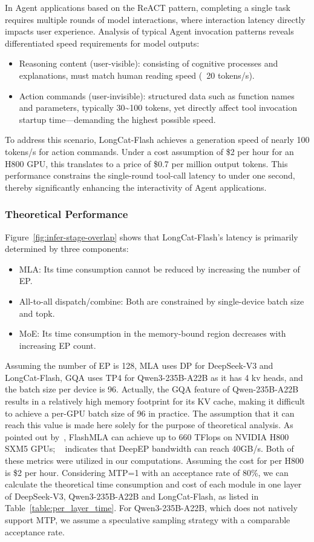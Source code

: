 \documentclass{article}
\newcommand{\longcat}{LongCat-Flash\xspace}
\begin{document}
In Agent applications based on the ReACT \citep{yao2023reactsynergizingreasoningacting} pattern, completing a single task requires multiple rounds of model interactions, where interaction latency directly impacts user experience. Analysis of typical Agent invocation patterns reveals differentiated speed requirements for model outputs:
\begin{itemize}
    \item Reasoning content (user-visible): consisting of cognitive processes and explanations, must match human reading speed (~20 tokens/s).
    \item Action commands (user-invisible): structured data such as function names and parameters, typically 30\textasciitilde 100 tokens, yet directly affect tool invocation startup time—demanding the highest possible speed.
\end{itemize}

To address this scenario, \longcat achieves a generation speed of nearly 100 tokens/s for action commands. Under a cost assumption of \$2 per hour for an H800 GPU, this translates to a price of \$0.7 per million output tokens. This performance constrains the single-round tool-call latency to under one second, thereby significantly enhancing the interactivity of Agent applications.

\subsubsection{Theoretical Performance}

Figure~\ref{fig:infer-stage-overlap} shows that \longcat's latency is primarily determined by three components:
\begin{itemize}
\item MLA: Its time consumption cannot be reduced by increasing the number of EP.
\item All-to-all dispatch/combine: Both are constrained by single-device batch size and topk.
\item MoE: Its time consumption in the memory-bound region decreases with increasing EP count.
\end{itemize}

Assuming the number of EP is 128, MLA uses DP for DeepSeek-V3 and \longcat, GQA uses TP4 for Qwen3-235B-A22B as it has 4 kv heads, and the batch size per device is 96. Actually, the GQA feature of Qwen-235B-A22B results in a relatively high memory footprint for its KV cache, making it difficult to achieve a per-GPU batch size of 96 in practice. The assumption that it can reach this value is made here solely for the purpose of theoretical analysis. As pointed out by~\citep{flashmla2025}, FlashMLA can achieve up to 660 TFlops on NVIDIA H800 SXM5 GPUs; ~\citet{deepep2025} indicates that DeepEP bandwidth can reach 40GB/s. Both of these metrics were utilized in our computations. Assuming the cost for per H800 is \$2 per hour. Considering MTP=1 with an acceptance rate of 80\%, we can calculate the theoretical time consumption and cost of each module in one layer of DeepSeek-V3, Qwen3-235B-A22B and \longcat, as listed in  Table~\ref{table:per_layer_time}. For Qwen3-235B-A22B, which does not natively support MTP, we assume a speculative sampling strategy with a comparable acceptance rate.
\end{document}
